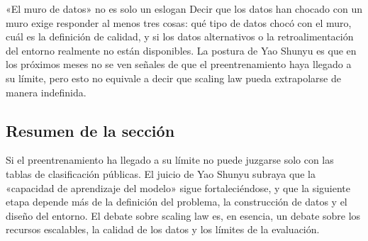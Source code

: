 \begin{warningbox}{«El muro de datos» no es solo un eslogan}
Decir que los datos han chocado con un muro exige responder al menos tres cosas: qué tipo de datos chocó con el muro, cuál es la definición de calidad, y si los datos alternativos o la retroalimentación del entorno realmente no están disponibles. La postura de Yao Shunyu es que en los próximos meses no se ven señales de que el preentrenamiento haya llegado a su límite, pero esto no equivale a decir que scaling law pueda extrapolarse de manera indefinida.
\end{warningbox}

\subsection{Resumen de la sección}

Si el preentrenamiento ha llegado a su límite no puede juzgarse solo con las tablas de clasificación públicas. El juicio de Yao Shunyu subraya que la «capacidad de aprendizaje del modelo» sigue fortaleciéndose, y que la siguiente etapa depende más de la definición del problema, la construcción de datos y el diseño del entorno. El debate sobre scaling law es, en esencia, un debate sobre los recursos escalables, la calidad de los datos y los límites de la evaluación.

